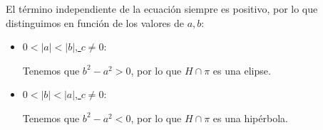 \documentclass[12pt]{article}
\begin{document}
\begin{ejercicio}[3 puntos]
\begin{itemize}
\begin{itemize}
\begin{itemize}
                    El término independiente de la ecuación siempre es positivo, por lo que distinguimos en función de los valores de $a, b$:
                    \begin{itemize}
                        \item \ul{$0<|a|<|b|$, $c\neq 0$}:
                        
                        Tenemos que $b^2-a^2>0$, por lo que $H\cap \pi$ es una elipse.

                        \item \ul{$0<|b|<|a|$, $c\neq 0$}:
                        
                        Tenemos que $b^2-a^2<0$, por lo que $H\cap \pi$ es una hipérbola.
                    \end{itemize}
                        
                \end{itemize}
            \end{itemize}
        \end{itemize}
    \end{ejercicio}
\end{document}
